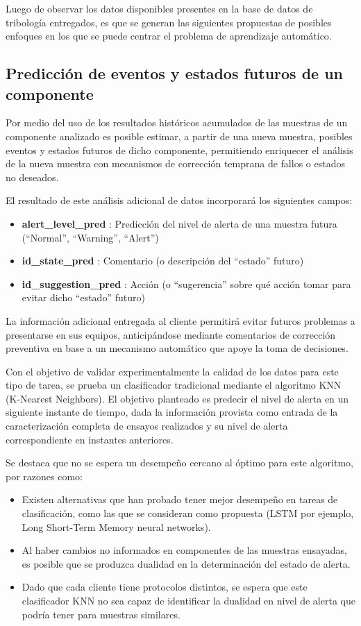 \documentclass{article}
\begin{document}
Luego de observar los datos disponibles presentes en la base de datos de tribología entregados, es que se generan las siguientes propuestas de posibles enfoques en los que se puede centrar el problema de aprendizaje automático.

\subsection{Predicción de eventos y estados futuros de un componente}

Por medio del uso de los resultados históricos acumulados de las muestras de un componente analizado es posible estimar, a partir de una nueva muestra, posibles eventos y estados futuros de dicho componente, permitiendo enriquecer el análisis de la nueva muestra con mecanismos de corrección temprana de fallos o estados no deseados. 

El resultado de este análisis adicional de datos incorporará los siguientes campos:

\begin{itemize}
	\item \textbf{alert\_level\_pred} : Predicción del nivel de alerta de una muestra futura (``Normal'', ``Warning'', ``Alert'')
	\item \textbf{id\_state\_pred} : Comentario (o descripción del ``estado'' futuro)
	\item \textbf{id\_suggestion\_pred} : Acción (o ``sugerencia'' sobre qué acción tomar para evitar dicho ``estado'' futuro)
\end{itemize}

La información adicional entregada al cliente permitirá evitar futuros problemas a presentarse en sus equipos, anticipándose mediante comentarios de corrección preventiva en base a un mecanismo automático que apoye la toma de decisiones.

Con el objetivo de validar experimentalmente la calidad de los datos para este tipo de tarea, se prueba un clasificador tradicional mediante el algoritmo KNN (K-Nearest Neighbors). El objetivo planteado es predecir el nivel de alerta en un siguiente instante de tiempo, dada la informaci\'on provista como entrada de la caracterizaci\'on completa de ensayos realizados y su nivel de alerta correspondiente en instantes anteriores.

Se destaca que no se espera un desempe\~no cercano al \'optimo para este algoritmo, por razones como:
\begin{itemize}
\item Existen alternativas que han probado tener mejor desempe\~no en tareas de clasificaci\'on, como las que se consideran como propuesta (LSTM por ejemplo, Long Short-Term Memory neural networks).
\item Al haber cambios no informados en componentes de las muestras ensayadas, es posible que se produzca dualidad en la determinaci\'on del estado de alerta.
\item Dado que cada cliente tiene protocolos distintos, se espera que este clasificador KNN no sea capaz de identificar la dualidad en nivel de alerta que podría tener para muestras similares.
\end{itemize}
\end{document}
